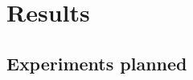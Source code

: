 \documentclass[webpdf,contemporary,large]{oup-authoring-template}%
\theoremstyle{thmstyleone}%
\theoremstyle{thmstyletwo}%
\theoremstyle{thmstylethree}%
\begin{document}
\section{Results}
\label{sec:results}




\subsection{Experiments planned}
\end{document}
